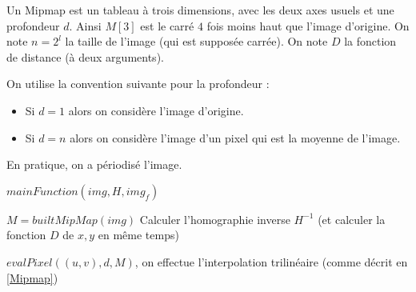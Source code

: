 \label{pseudo_code_Mipmap}

Un Mipmap est un tableau à trois dimensions, avec les deux axes usuels et une profondeur $d$.
Ainsi $M[3]$ est le carré $4$ fois moins haut que l'image d'origine. On note $n=2^l$ la taille de l'image (qui est supposée carrée). On note $D$ la fonction de distance (à deux arguments).

On utilise la convention suivante pour la profondeur : 
\begin{itemize}
\item Si $d = 1$ alors on considère l'image d'origine.
\item Si $d = n$ alors on considère l'image d'un pixel qui est la moyenne de l'image.
\end{itemize}

En pratique, on a périodisé l'image.


\medbreak
\medbreak
\begin{algorithm}[H]
\caption{$mainFunction(img,H,img_f)$}
\label{Mipmap1}
$M=builtMipMap(img)$ 
Calculer l'homographie inverse $H^{-1}$ (et calculer la fonction $D$ de $x,y$ en même temps)
\end{algorithm}

\medbreak
\medbreak
\medbreak
\medbreak

\begin{algorithm}[H]
\caption{$evalPixel((u,v),d,M)$, on effectue l'interpolation trilinéaire (comme décrit en \ref{Mipmap})}
\label{intertri1}

\end{algorithm}

